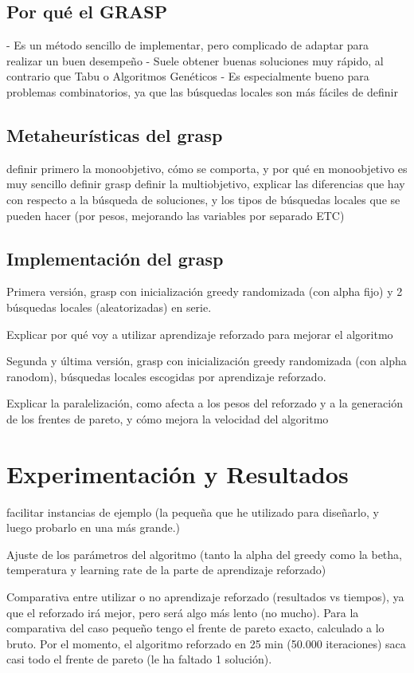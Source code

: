 \documentclass[12pt,a4paper]{book}
\begin{document}
\section{Por qué el GRASP}
- Es un método sencillo de implementar, pero complicado de adaptar para realizar un buen desempeño
- Suele obtener buenas soluciones muy rápido, al contrario que Tabu o Algoritmos Genéticos
- Es especialmente bueno para problemas combinatorios, ya que las búsquedas locales son más fáciles de definir

\section{Metaheurísticas del grasp}
definir primero la monoobjetivo, cómo se comporta, y por qué en monoobjetivo es muy sencillo definir grasp
definir la multiobjetivo, explicar las diferencias que hay con respecto a la búsqueda de soluciones, y los tipos de búsquedas locales que se pueden hacer (por pesos, mejorando las variables por separado ETC)

\section{Implementación del grasp}
Primera versión, grasp con inicialización greedy randomizada (con alpha fijo) y 2 búsquedas locales (aleatorizadas) en serie.

Explicar por qué voy a utilizar aprendizaje reforzado para mejorar el algoritmo

Segunda y última versión, grasp con inicialización greedy randomizada (con alpha ranodom), búsquedas locales escogidas por aprendizaje reforzado.

Explicar la paralelización, como afecta a los pesos del reforzado y a la generación de los frentes de pareto, y cómo mejora la velocidad del algoritmo

\chapter{Experimentación y Resultados}
facilitar instancias de ejemplo (la pequeña que he utilizado para diseñarlo, y luego probarlo en una más grande.)

Ajuste de los parámetros del algoritmo (tanto la alpha del greedy como la betha, temperatura y learning rate de la parte de aprendizaje reforzado)

Comparativa entre utilizar o no aprendizaje reforzado (resultados vs tiempos), ya que el reforzado irá mejor, pero será algo más lento (no mucho).
Para la comparativa del caso pequeño tengo el frente de pareto exacto, calculado a lo bruto. Por el momento, el algoritmo reforzado en 25 min (50.000 iteraciones) saca casi todo el frente de pareto (le ha faltado 1 solución).
\end{document}
